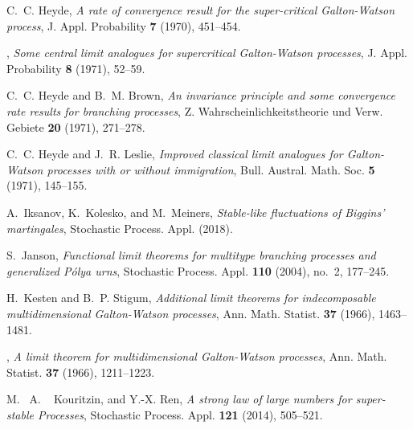 \documentclass[12pt,a4paper]{amsart}
\theoremstyle{plain}
\theoremstyle{definition}
\numberwithin{equation}{section}
\begin{document}
\begin{thebibliography}{10}
C.~C. Heyde, \emph{A rate of convergence result for the super-critical
  {G}alton-{W}atson process}, J. Appl. Probability \textbf{7} (1970), 451--454.

\bysame, \emph{Some central limit analogues for supercritical {G}alton-{W}atson
  processes}, J. Appl. Probability \textbf{8} (1971), 52--59.

C.~C. Heyde and B.~M. Brown, \emph{An invariance principle and some convergence
  rate results for branching processes}, Z. Wahrscheinlichkeitstheorie und
  Verw. Gebiete \textbf{20} (1971), 271--278.

C.~C. Heyde and J.~R. Leslie, \emph{Improved classical limit analogues for
  {G}alton-{W}atson processes with or without immigration}, Bull. Austral.
  Math. Soc. \textbf{5} (1971), 145--155.



A.~Iksanov, K.~Kolesko, and M.~Meiners, \emph{Stable-like fluctuations of {B}iggins' martingales}, Stochastic
  Process. Appl. (2018).

S.~Janson, \emph{Functional limit theorems for multitype branching processes
  and generalized {P}\'{o}lya urns}, Stochastic Process. Appl. \textbf{110}
  (2004), no.~2, 177--245.

H.~Kesten and B.~P. Stigum, \emph{Additional limit theorems for indecomposable
  multidimensional {G}alton-{W}atson processes}, Ann. Math. Statist.
  \textbf{37} (1966), 1463--1481.

\bysame, \emph{A limit theorem for multidimensional {G}alton-{W}atson
  processes}, Ann. Math. Statist. \textbf{37} (1966), 1211--1223.

 M. ~A. ~ Kouritzin, and  Y.-X. Ren,  \emph{A strong law of large numbers for super-stable Processes},  Stochastic Process. Appl.  \textbf{121} (2014),  505--521.
  

\end{thebibliography}
\end{document}
